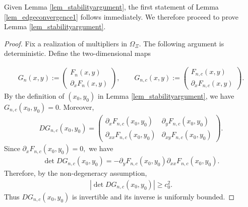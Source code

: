 \documentclass[12pt]{article}
\theoremstyle{plain}
\numberwithin{equation}{section}
\begin{document}
Given Lemma \ref{lem_stabilityargument}, the first statement of Lemma \ref{lem_edgeconvergence1} follows immediately. We therefore proceed to prove Lemma \ref{lem_stabilityargument}.

\begin{proof}
	Fix a realization of multipliers in $\Omega_{\Xi}$. The following argument is deterministic.
	Define the two-dimensional maps
	
	\begin{align*}
		G_n(x,y):=
		\begin{pmatrix}
			F_n(x,y)\\
			\partial_xF_n(x,y)
		\end{pmatrix},
		\qquad
		G_{n,c}(x,y):=
		\begin{pmatrix}
			F_{n,c}(x,y)\\
			\partial_xF_{n,c}(x,y)
		\end{pmatrix}.
	\end{align*}
	By the definition of $(x_0,y_0)$ in Lemma \ref{lem_stabilityargument}, we have $G_{n,c}(x_0,y_0)=0.$ Moreover,
	\begin{align*}
		DG_{n,c}(x_0,y_0)
		=
		\begin{pmatrix}
			\partial_xF_{n,c}(x_0,y_0)
			&
			\partial_yF_{n,c}(x_0,y_0)\\
			\partial_{xx}F_{n,c}(x_0,y_0)
			&
			\partial_{xy}F_{n,c}(x_0,y_0)
		\end{pmatrix}.
	\end{align*}
	Since $\partial_xF_{n,c}(x_0,y_0)=0,$
	we have
	\begin{align*}
		\det DG_{n,c}(x_0,y_0)
		=
		-\partial_yF_{n,c}(x_0,y_0)
		\partial_{xx}F_{n,c}(x_0,y_0).
	\end{align*}
	Therefore, by the non-degeneracy assumption,
	\begin{align*}
		|\det DG_{n,c}(x_0,y_0)|\ge c_0^2.
	\end{align*}
	Thus $DG_{n,c}(x_0,y_0)$ is invertible and its inverse is uniformly bounded.
	

\end{proof}
\end{document}
